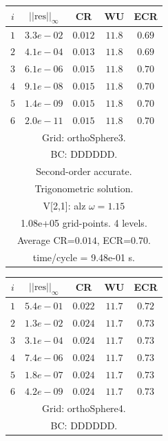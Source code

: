 \begin{table}[hbt]
\begin{center}
{\tablefontsize
\begin{tabular}{|c|c|c|c|c|} \hline 
 $i$   & $\vert\vert\mbox{res}\vert\vert_\infty$  &  CR     &  WU    & ECR  \\   \hline 
 $ 1$  & $ 3.3e-02$ & $0.012$ & $11.8$ & $0.69$ \\ 
 $ 2$  & $ 4.1e-04$ & $0.013$ & $11.8$ & $0.69$ \\ 
 $ 3$  & $ 6.1e-06$ & $0.015$ & $11.8$ & $0.70$ \\ 
 $ 4$  & $ 9.1e-08$ & $0.015$ & $11.8$ & $0.70$ \\ 
 $ 5$  & $ 1.4e-09$ & $0.015$ & $11.8$ & $0.70$ \\ 
 $ 6$  & $ 2.0e-11$ & $0.015$ & $11.8$ & $0.70$ \\ 
\hline 
\multicolumn{5}{|c|}{Grid: orthoSphere3.}  \\
\multicolumn{5}{|c|}{BC: DDDDDD.}  \\
\multicolumn{5}{|c|}{Second-order accurate.}  \\
\multicolumn{5}{|c|}{Trigonometric solution.}  \\
\multicolumn{5}{|c|}{V[2,1]: alz $\omega=1.15$}  \\
\multicolumn{5}{|c|}{1.08e+05 grid-points. 4 levels.}  \\
\multicolumn{5}{|c|}{Average CR=$0.014$, ECR=$0.70$.}  \\
\multicolumn{5}{|c|}{time/cycle = 9.48e-01 s.}  \\
\hline 
\end{tabular}
\begin{tabular}{|c|c|c|c|c|} \hline 
 $i$   & $\vert\vert\mbox{res}\vert\vert_\infty$  &  CR     &  WU    & ECR  \\   \hline 
 $ 1$  & $ 5.4e-01$ & $0.022$ & $11.7$ & $0.72$ \\ 
 $ 2$  & $ 1.3e-02$ & $0.024$ & $11.7$ & $0.73$ \\ 
 $ 3$  & $ 3.1e-04$ & $0.024$ & $11.7$ & $0.73$ \\ 
 $ 4$  & $ 7.4e-06$ & $0.024$ & $11.7$ & $0.73$ \\ 
 $ 5$  & $ 1.8e-07$ & $0.024$ & $11.7$ & $0.73$ \\ 
 $ 6$  & $ 4.2e-09$ & $0.024$ & $11.7$ & $0.73$ \\ 
\hline 
\multicolumn{5}{|c|}{Grid: orthoSphere4.}  \\
\multicolumn{5}{|c|}{BC: DDDDDD.}  \\

\end{tabular}}
\end{center}
\end{table}
